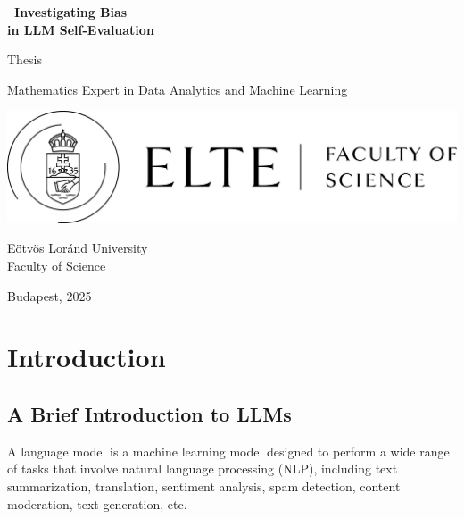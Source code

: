 \documentclass[noindent,nohyp,parspace,titlepage,twoside,12pt]{article}
\title{\TITLE}
\author{\AUTHOR}
\def\TITLE{\
  Investigating Bias \\
  in LLM Self-Evaluation\
}
\begin{document}
\begin{titlepage}

  \begin{center}
    \Huge\textbf{\TITLE}\normalsize
  \end{center}
  \begin{center}
    \Large Thesis \normalsize
  \end{center}

  \vfill


  \vfill

  \begin{center}
    \Large Mathematics Expert in Data Analytics and Machine Learning
    \normalsize
  \end{center}

  \begin{center}
    \includegraphics[scale=0.2]{img/logo.png} \\
  \end{center}

  \begin{center}
    \Large Eötvös Loránd University \\
    \Large Faculty of Science \normalsize
  \end{center}

  \begin{center}
    \Large Budapest, 2025 \normalsize
  \end{center}

\end{titlepage}

  \tableofcontents

\newpage

  \section{Introduction}

    \subsection{A Brief Introduction to LLMs}

      A language model is a machine learning model designed to perform a wide
      range of tasks that involve natural language processing (NLP), including
      text summarization, translation, sentiment analysis, spam detection,
      content moderation, text generation, etc.
\end{document}
